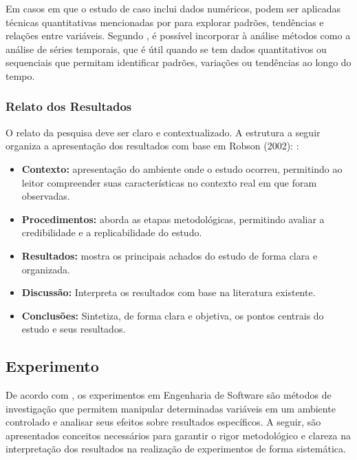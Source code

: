 Em casos em que o estudo de caso inclui dados numéricos, podem ser aplicadas técnicas quantitativas mencionadas por  para explorar padrões, tendências e relações entre variáveis. Segundo , é possível incorporar à análise métodos como a análise de séries temporais, que é útil quando se tem dados  quantitativos ou sequenciais que permitam identificar padrões, variações ou tendências ao longo do tempo.

\subsubsection{Relato dos Resultados}

O relato da pesquisa deve ser claro e contextualizado. A estrutura a seguir organiza a apresentação dos resultados com base em Robson (2002): \cite{robson2002real}:

\begin{itemize}
\item \textbf{Contexto:} apresentação do ambiente onde o estudo ocorreu, permitindo ao leitor compreender suas características no contexto real em que foram observadas.

\item \textbf{Procedimentos:} aborda as etapas metodológicas, permitindo avaliar a credibilidade e a replicabilidade do estudo.

\item \textbf{Resultados:} mostra os principais achados do estudo de forma clara e organizada.

\item \textbf{Discussão:} Interpreta os resultados com base na literatura existente.

\item \textbf{Conclusões:} Sintetiza, de forma clara e objetiva, os pontos centrais do estudo e seus resultados.
\end{itemize}


\subsection{Experimento}

De acordo com , os experimentos em Engenharia de Software são métodos de investigação que permitem manipular determinadas variáveis em um ambiente controlado e analisar seus efeitos sobre resultados específicos. A seguir, são apresentados conceitos necessários para garantir o rigor metodológico e clareza na interpretação dos resultados na realização de experimentos de forma sistemática.

